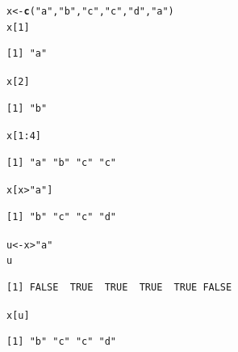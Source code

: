 \documentclass{article}\usepackage[]{graphicx}\usepackage[]{color}
\makeatletter
\newcommand{\hlnum}[1]{\textcolor[rgb]{0.686,0.059,0.569}{#1}}%
\newcommand{\hlstr}[1]{\textcolor[rgb]{0.192,0.494,0.8}{#1}}%
\newcommand{\hlopt}[1]{\textcolor[rgb]{0,0,0}{#1}}%
\newcommand{\hlstd}[1]{\textcolor[rgb]{0.345,0.345,0.345}{#1}}%
\newcommand{\hlkwb}[1]{\textcolor[rgb]{0.69,0.353,0.396}{#1}}%
\newcommand{\hlkwd}[1]{\textcolor[rgb]{0.737,0.353,0.396}{\textbf{#1}}}%
\newenvironment{kframe}{%
 \def\at@end@of@kframe{}%
 \ifinner\ifhmode%
  \def\at@end@of@kframe{\end{minipage}}%
  \begin{minipage}{\columnwidth}%
 \fi\fi%
 \def\FrameCommand##1{\hskip\@totalleftmargin \hskip-\fboxsep
 \colorbox{shadecolor}{##1}\hskip-\fboxsep
     \hskip-\linewidth \hskip-\@totalleftmargin \hskip\columnwidth}%
 \MakeFramed {\advance\hsize-\width
   \@totalleftmargin\z@ \linewidth\hsize
   \@setminipage}}%
 {\par\unskip\endMakeFramed%
 \at@end@of@kframe}
\newenvironment{knitrout}{}{} %
\makeatother
\begin{document}
\begin{knitrout}
\color{fgcolor}\begin{kframe}
\begin{alltt}
  \hlstd{x} \hlkwb{<-} \hlkwd{c}\hlstd{(}\hlstr{"a"}\hlstd{,} \hlstr{"b"}\hlstd{,} \hlstr{"c"}\hlstd{,} \hlstr{"c"}\hlstd{,} \hlstr{"d"}\hlstd{,} \hlstr{"a"}\hlstd{)}
  \hlstd{x[}\hlnum{1}\hlstd{]}
\end{alltt}
\begin{verbatim}
[1] "a"
\end{verbatim}
\begin{alltt}
  \hlstd{x[}\hlnum{2}\hlstd{]}
\end{alltt}
\begin{verbatim}
[1] "b"
\end{verbatim}
\begin{alltt}
  \hlstd{x[}\hlnum{1}\hlopt{:}\hlnum{4}\hlstd{]}
\end{alltt}
\begin{verbatim}
[1] "a" "b" "c" "c"
\end{verbatim}
\begin{alltt}
  \hlstd{x[x} \hlopt{>} \hlstr{"a"}\hlstd{]}
\end{alltt}
\begin{verbatim}
[1] "b" "c" "c" "d"
\end{verbatim}
\begin{alltt}
  \hlstd{u} \hlkwb{<-} \hlstd{x} \hlopt{>} \hlstr{"a"}
  \hlstd{u}
\end{alltt}
\begin{verbatim}
[1] FALSE  TRUE  TRUE  TRUE  TRUE FALSE
\end{verbatim}
\begin{alltt}
  \hlstd{x[u]}
\end{alltt}
\begin{verbatim}
[1] "b" "c" "c" "d"
\end{verbatim}
\end{kframe}
\end{knitrout}
\end{document}
